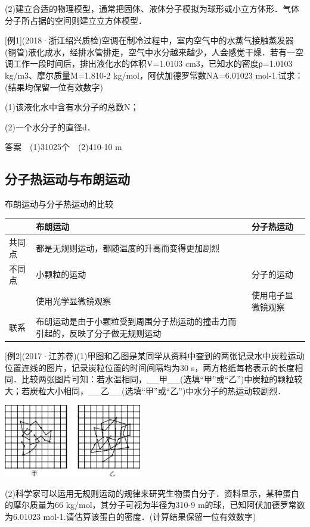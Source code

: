 (2)建立合适的物理模型，通常把固体、液体分子模拟为球形或小立方体形．气体分子所占据的空间则建立立方体模型．

{[}例1{]}(2018·浙江绍兴质检)空调在制冷过程中，室内空气中的水蒸气接触蒸发器(铜管)液化成水，经排水管排走，空气中水分越来越少，人会感觉干燥．若有一空调工作一段时间后，排出液化水的体积V=1.0103
cm3，已知水的密度ρ=1.0103 kg/m3、摩尔质量M=1.810-2
kg/mol，阿伏加德罗常数NA=6.01023 mol-1.试求：(结果均保留一位有效数字)

(1)该液化水中含有水分子的总数N；

(2)一个水分子的直径d．

答案　(1)31025个　(2)410-10 m

\subsection{分子热运动与布朗运动}

布朗运动与分子热运动的比较

\begin{longtable}[]{@{}lll@{}}
\toprule
& 布朗运动 & 分子热运动\tabularnewline
\midrule
\endhead
共同点 & 都是无规则运动，都随温度的升高而变得更加剧烈 &\tabularnewline
不同点 & 小颗粒的运动 & 分子的运动\tabularnewline
& 使用光学显微镜观察 & 使用电子显微镜观察\tabularnewline
联系 &
布朗运动是由于小颗粒受到周围分子热运动的撞击力而引起的，反映了分子做无规则运动
&\tabularnewline
\bottomrule
\end{longtable}

{[}例2{]}(2017·江苏卷)(1)甲图和乙图是某同学从资料中查到的两张记录水中炭粒运动位置连线的图片，记录炭粒位置的时间间隔均为30
s，两方格纸每格表示的长度相同．比较两张图片可知：若水温相同，\_\_甲\_\_(选填``甲''或``乙'')中炭粒的颗粒较大；若炭粒大小相同，\_\_乙\_\_(选填``甲''或``乙'')中水分子的热运动较剧烈．

\begin{center}\includegraphics[width=2.36806in,height=1.24514in]{media/image486.png}\end{center}
(2)科学家可以运用无规则运动的规律来研究生物蛋白分子．资料显示，某种蛋白的摩尔质量为66
kg/mol，其分子可视为半径为310-9 m的球，已知阿伏加德罗常数为6.01023
mol-1.请估算该蛋白的密度．(计算结果保留一位有效数字)

